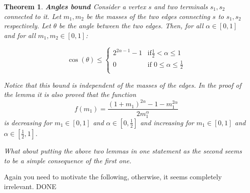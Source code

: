 \documentclass[11pt,reqno,a4paper]{amsart}
\numberwithin{equation}{section}
\theoremstyle{mytheorem}
\newtheorem{theorem}[subsection]{Theorem}
\theoremstyle{myremark}
\theoremstyle{myparagraph}
\begin{document}
    \begin{theorem}
        \label{lemma:bernot_angles_sum_bound}
        \textbf{Angles bound \cite[Lemma 12.5]{Bernot}}
        Consider a vertex $s$ and two terminals $s_1, s_2$ connected to it. Let $m_1, m_2$ be the masses of the two edges connecting
        $s$ to $s_1, s_2$ respectively. Let $\theta$ be the angle between the two edges.
        Then, for all $\alpha \in [0,1]$ and for all $m_1, m_2 \in [0,1]$:

        \begin{equation}
            \cos(\theta) \le \begin{cases}
                                 2^{2\alpha-1}-1 & \text{if} \frac{1}{2} < \alpha \le 1\\
                                 0 & \text{if 0} \le \alpha \le \frac{1}{2}\\
            \end{cases}
        \end{equation}

        Notice that this bound is independent of the masses of the edges. In the proof of the lemma it is also proved that the function
        \begin{equation}
            f(m_1) = \frac{(1+m_1)^{2\alpha} - 1 - m_1^{2\alpha}}{2m_1^\alpha}
        \end{equation}
        is decreasing for $m_1 \in [0,1]$ and $\alpha \in [0,\frac{1}{2}]$ and increasing for $m_1 \in [0,1]$ and $\alpha \in [\frac{1}{2},1]$.

        What about putting the above two lemmas in one statement as the second seems to be a simple consequence of the first one.

    \end{theorem}

    {\color{red} Again you need to motivate the following, otherwise, it seems completely irrelevant. DONE}
\end{document}
